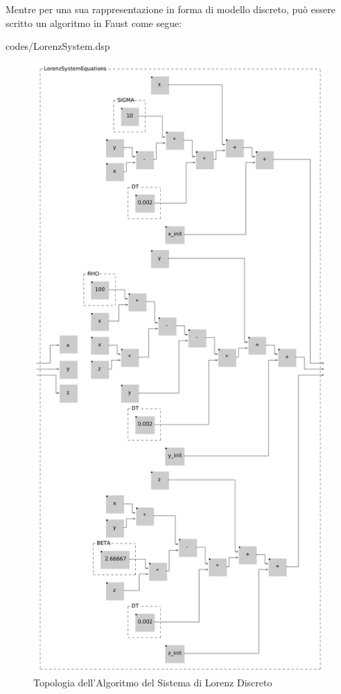 Mentre per una sua rappresentazione in forma di modello discreto,
può essere scritto un algoritmo in Faust come segue:

\clearpage

\vspace{0.5cm} 

{codes/LorenzSystem.dsp}

\clearpage

\begin{figure}[h!]
\begin{center}
    \includegraphics[width=11.5cm]{figures/LorenzSystemInside.pdf} 
    \caption{Topologia dell'Algoritmo del Sistema di Lorenz Discreto} 
\end{center}
\vspace{0.5cm}
\end{figure}
\clearpage

